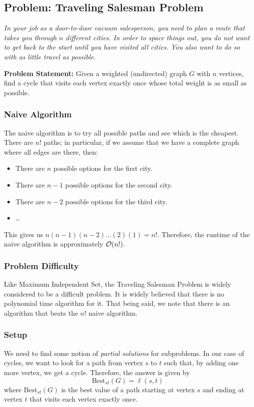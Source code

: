 \documentclass[letterpaper]{article}
\begin{document}
\subsection{Problem: Traveling Salesman Problem}
\emph{In your job as a door-to-door vacuum salesperson, you need to plan a route that takes you through $n$ different cities. In order to space things out, you do not want to get back to the start until you have visited all cities. You also want to do so with as little travel as possible. }

\bigskip 

\textbf{Problem Statement:} Given a weighted (undirected) graph $G$ with $n$ vertices, find a cycle that visits each vertex exactly once whose total weight is as small as possible.


\subsubsection{Naive Algorithm}
The naive algorithm is to try all possible paths and see which is the cheapest. There are $n!$ paths; in particular, if we assume that we have a complete graph where all edges are there, then: 
\begin{itemize}
    \item There are $n$ possible options for the first city.
    \item There are $n - 1$ possible options for the second city. 
    \item There are $n - 2$ possible options for the third city. 
    \item \dots
\end{itemize}
This gives us $n(n - 1)(n - 2) \dots (2)(1) = n!$. Therefore, the runtime of the naive algorithm is approximately $\mathcal{O}(n!)$. 

\subsubsection{Problem Difficulty}
Like Maximum Independent Set, the Traveling Salesman Problem is widely considered to be a difficult problem. It is widely believed that there is no polynomial time algorithm for it. That being said, we note that there is an algorithm that beats the $n!$ naive algorithm.

\subsubsection{Setup}
We need to find some notion of \emph{partial solutions} for subproblems. In our case of cycles, we want to look for a path from vertex $s$ to $t$ such that, by adding one more vertex, we get a cycle. Therefore, the answer is given by 
\[\text{Best}_{st}(G) = \ell(s, t)\]
where $\text{Best}_{st}(G)$ is the best value of a path starting at vertex $s$ and ending at vertex $t$ that visits each vertex exactly once. 
\end{document}
